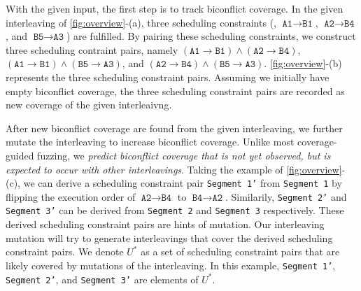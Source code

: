 With the given input, the first step is to track biconflict coverage.
In the given interleaving of \autoref{fig:overview}-(a), three
scheduling constraints (\ie, $\texttt{A1} \rightarrow \texttt{B1}$,
$\texttt{A2} \rightarrow \texttt{B4}$, and
$\texttt{B5} \rightarrow \texttt{A3}$) are fulfilled.
%
By pairing these scheduling constraints, we construct three scheduling
contraint pairs, namely
$(\texttt{A1} \rightarrow \texttt{B1}) \wedge (\texttt{A2} \rightarrow
\texttt{B4})$,
$(\texttt{A1} \rightarrow \texttt{B1}) \wedge (\texttt{B5} \rightarrow
\texttt{A3})$, and
$(\texttt{A2} \rightarrow \texttt{B4}) \wedge (\texttt{B5} \rightarrow
\texttt{A3})$.
%
\autoref{fig:overview}-(b) represents the three scheduling constraint
pairs.
%
Assuming we initially have empty biconflict coverage, the three
scheduling constraint pairs are recorded as new coverage of the given
interleaivng.



%
After new biconflict coverage are found from the given interleaving,
we further mutate the interleaving to increase biconflict coverage.
%
Unlike most coverage-guided fuzzing, we \textit{predict biconflict
  coverage that is not yet observed, but is expected to occur with
  other interleavings}.
%
Taking the example of \autoref{fig:overview}-(c), we can derive a
scheduling constraint pair \texttt{Segment 1'} from \texttt{Segment 1}
by flipping the execution order of
$\texttt{A2} \rightarrow \texttt{B4}$ to
$\texttt{B4} \rightarrow \texttt{A2}$.
%
Similarily, \texttt{Segment 2'} and \texttt{Segment 3'} can be derived
from \texttt{Segment 2} and \texttt{Segment 3} respectively.
%
These derived scheduling constraint pairs are hints of mutation. Our
interleaving mutation will try to generate interleavings that cover
the derived scheduling constraint pairs.
%
We denote $U^*$ as a set of scheduling constraint pairs that are
likely covered by mutations of the interleaving. In this example,
\texttt{Segment 1'}, \texttt{Segment 2'}, and \texttt{Segment 3'} are
elements of $U^*$.


